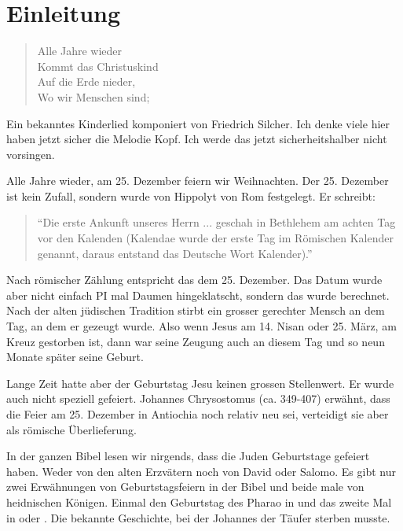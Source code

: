 \documentclass[fontsize=16pt]{mybib}
\title{\biblezit{IIPetr}{3:1-8}}
\author{Lothar Schmid}
\date{}
\begin{document}
\mytitlepage
\tableofcontents

\newpage

\section{Einleitung}
\begin{center}
  \begin{verse}
  Alle Jahre wieder\\
  Kommt das Christuskind\\
  Auf die Erde nieder,\\
  Wo wir Menschen sind;    
  \end{verse}
\end{center}
Ein bekanntes Kinderlied komponiert von Friedrich Silcher. Ich denke viele hier haben jetzt sicher die Melodie Kopf. Ich werde das jetzt sicherheitshalber nicht vorsingen.

Alle Jahre wieder, am 25. Dezember feiern wir Weihnachten. Der 25. Dezember ist kein Zufall, sondern wurde von Hippolyt von Rom festgelegt. Er schreibt: 
\begin{quote}\enquote{Die erste Ankunft unseres Herrn ... geschah in Bethlehem am achten Tag vor den Kalenden (Kalendae wurde der erste Tag im Römischen Kalender genannt, daraus entstand das Deutsche Wort Kalender).} 
\end{quote}
Nach römischer Zählung entspricht das dem 25. Dezember. Das Datum wurde aber nicht einfach PI mal Daumen hingeklatscht, sondern das wurde berechnet. Nach der alten jüdischen Tradition stirbt ein grosser gerechter Mensch an dem Tag, an dem er gezeugt wurde. Also wenn Jesus am 14. Nisan oder 25. März, am Kreuz gestorben ist, dann war seine Zeugung auch an diesem Tag und so neun Monate später seine Geburt.

Lange Zeit hatte aber der Geburtstag Jesu keinen grossen Stellenwert. Er wurde auch nicht speziell gefeiert. Johannes Chrysostomus (ca. 349-407) erwähnt, dass die Feier am 25. Dezember in Antiochia noch relativ neu sei, verteidigt sie aber als römische Überlieferung.

In der ganzen Bibel lesen wir nirgends, dass die Juden Geburtstage gefeiert haben. Weder von den alten Erzvätern noch von David oder Salomo. Es gibt nur zwei Erwähnungen von Geburtstagsfeiern in der Bibel und beide male von heidnischen Königen. Einmal den Geburtstag des Pharao in  und das zweite Mal in  oder . Die bekannte Geschichte, bei der Johannes der Täufer sterben musste.
\end{document}
